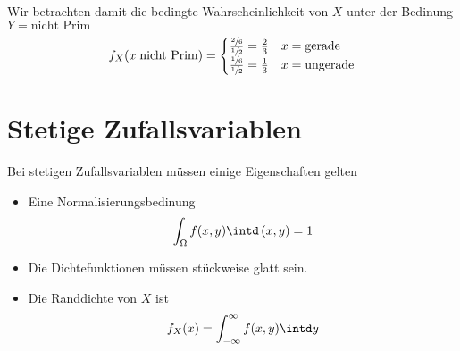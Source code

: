 Wir betrachten damit die bedingte Wahrscheinlichkeit von $X$ unter der Bedinung $Y=\text{nicht Prim}$
\begin{equation*}
	f_X(x|\text{nicht Prim})=\begin{cases}
		\frac{\sfrac26}{\sfrac12}=\frac23&x=\text{gerade}\\
		\frac{\sfrac16}{\sfrac12}=\frac13&x=\text{ungerade}\\
	\end{cases}
\end{equation*}

\section{Stetige Zufallsvariablen}
Bei stetigen Zufallsvariablen müssen einige Eigenschaften gelten
\begin{itemize}
	\item Eine Normalisierungsbedinung
	\begin{equation*}
		\int_{\Omega}f(x,y)\intd\,(x,y)=1
	\end{equation*}
	\item Die Dichtefunktionen müssen stückweise glatt sein.
	\item Die Randdichte von $X$ ist
	\begin{equation*}
		f_X(x)=\int_{-\infty}^\infty f(x,y)\intd y
	\end{equation*}
\end{itemize}


